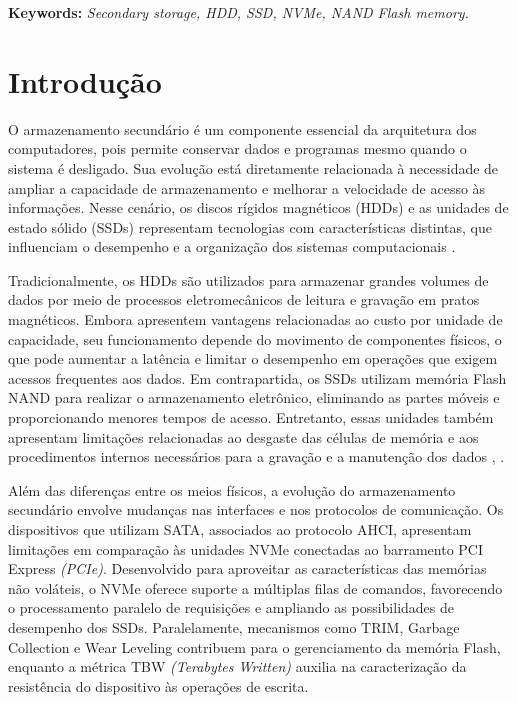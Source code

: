 \documentclass[12pt]{article}
\begin{document}
\par
{\setlength{\leftskip}{0.7cm}
\noindent\textbf{Keywords:} \textit{Secondary storage, HDD, SSD, NVMe, NAND Flash memory.}\par}

\section{Introdução}

O armazenamento secundário é um componente essencial da arquitetura dos computadores, pois permite conservar dados e programas mesmo quando o sistema é desligado. Sua evolução está diretamente relacionada à necessidade de ampliar a capacidade de armazenamento e melhorar a velocidade de acesso às informações. Nesse cenário, os discos rígidos magnéticos (HDDs) e as unidades de estado sólido (SSDs) representam tecnologias com características distintas, que influenciam o desempenho e a organização dos sistemas computacionais \cite{stallings2017}.

Tradicionalmente, os HDDs são utilizados para armazenar grandes volumes de dados por meio de processos eletromecânicos de leitura e gravação em pratos magnéticos. Embora apresentem vantagens relacionadas ao custo por unidade de capacidade, seu funcionamento depende do movimento de componentes físicos, o que pode aumentar a latência e limitar o desempenho em operações que exigem acessos frequentes aos dados. Em contrapartida, os SSDs utilizam memória Flash NAND para realizar o armazenamento eletrônico, eliminando as partes móveis e proporcionando menores tempos de acesso. Entretanto, essas unidades também apresentam limitações relacionadas ao desgaste das células de memória e aos procedimentos internos necessários para a gravação e a manutenção dos dados \cite{silva2025}, \cite{stallings2017}.

Além das diferenças entre os meios físicos, a evolução do armazenamento secundário envolve mudanças nas interfaces e nos protocolos de comunicação. Os dispositivos que utilizam SATA, associados ao protocolo AHCI, apresentam limitações em comparação às unidades NVMe conectadas ao barramento PCI Express \textit{(PCIe)}. Desenvolvido para aproveitar as características das memórias não voláteis, o NVMe oferece suporte a múltiplas filas de comandos, favorecendo o processamento paralelo de requisições e ampliando as possibilidades de desempenho dos SSDs. Paralelamente, mecanismos como TRIM, Garbage Collection e Wear Leveling contribuem para o gerenciamento da memória Flash, enquanto a métrica TBW \textit {(Terabytes Written)} auxilia na caracterização da resistência do dispositivo às operações de escrita.
\end{document}
